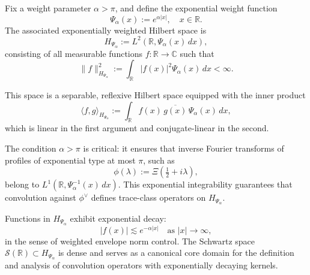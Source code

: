 \begin{definition}
\label{def:weighted-fourier-space}
Fix a weight parameter \( \alpha > \pi \), and define the exponential weight function
\[
\Psi_\alpha(x) := e^{\alpha |x|}, \quad x \in \mathbb{R}.
\]
The associated exponentially weighted Hilbert space is
\[
H_{\Psi_\alpha} := L^2(\mathbb{R}, \Psi_\alpha(x)\, dx),
\]
consisting of all measurable functions \( f \colon \mathbb{R} \to \mathbb{C} \) such that
\[
\|f\|_{H_{\Psi_\alpha}}^2 := \int_{\mathbb{R}} |f(x)|^2 \Psi_\alpha(x)\, dx < \infty.
\]

This space is a separable, reflexive Hilbert space equipped with the inner product
\[
\langle f, g \rangle_{H_{\Psi_\alpha}} := \int_{\mathbb{R}} f(x)\, \overline{g(x)}\, \Psi_\alpha(x)\, dx,
\]
which is linear in the first argument and conjugate-linear in the second.

\medskip

The condition \( \alpha > \pi \) is critical: it ensures that inverse Fourier transforms of profiles of exponential type at most \( \pi \), such as
\[
\phi(\lambda) := \Xi\left( \tfrac{1}{2} + i\lambda \right),
\]
belong to \( L^1(\mathbb{R}, \Psi_\alpha^{-1}(x)\, dx) \). This exponential integrability guarantees that convolution against \( \phi^\vee \) defines trace-class operators on \( H_{\Psi_\alpha} \).

\medskip

Functions in \( H_{\Psi_\alpha} \) exhibit exponential decay:
\[
|f(x)| \lesssim e^{-\alpha |x|} \quad \text{as } |x| \to \infty,
\]
in the sense of weighted envelope norm control. The Schwartz space \( \mathcal{S}(\mathbb{R}) \subset H_{\Psi_\alpha} \) is dense and serves as a canonical core domain for the definition and analysis of convolution operators with exponentially decaying kernels.
\end{definition}
